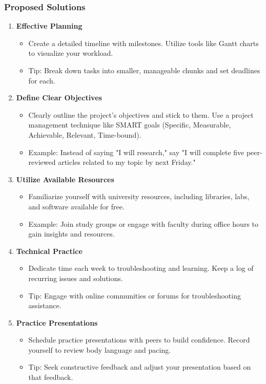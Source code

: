 \documentclass[aspectratio=169]{beamer}
\begin{document}
\begin{frame}[fragile]
  \frametitle{Proposed Solutions}
  \begin{enumerate}
    \item \textbf{Effective Planning}
      \begin{itemize}
        \item Create a detailed timeline with milestones. Utilize tools like Gantt charts to visualize your workload.
        \item Tip: Break down tasks into smaller, manageable chunks and set deadlines for each.
      \end{itemize}
    \item \textbf{Define Clear Objectives}
      \begin{itemize}
        \item Clearly outline the project's objectives and stick to them. Use a project management technique like SMART goals (Specific, Measurable, Achievable, Relevant, Time-bound).
        \item Example: Instead of saying "I will research," say "I will complete five peer-reviewed articles related to my topic by next Friday."
      \end{itemize}
    \item \textbf{Utilize Available Resources}
      \begin{itemize}
        \item Familiarize yourself with university resources, including libraries, labs, and software available for free.
        \item Example: Join study groups or engage with faculty during office hours to gain insights and resources.
      \end{itemize}
    \item \textbf{Technical Practice}
      \begin{itemize}
        \item Dedicate time each week to troubleshooting and learning. Keep a log of recurring issues and solutions.
        \item Tip: Engage with online communities or forums for troubleshooting assistance.
      \end{itemize}
    \item \textbf{Practice Presentations}
      \begin{itemize}
        \item Schedule practice presentations with peers to build confidence. Record yourself to review body language and pacing.
        \item Tip: Seek constructive feedback and adjust your presentation based on that feedback.
      \end{itemize}
  \end{enumerate}
\end{frame}
\end{document}
